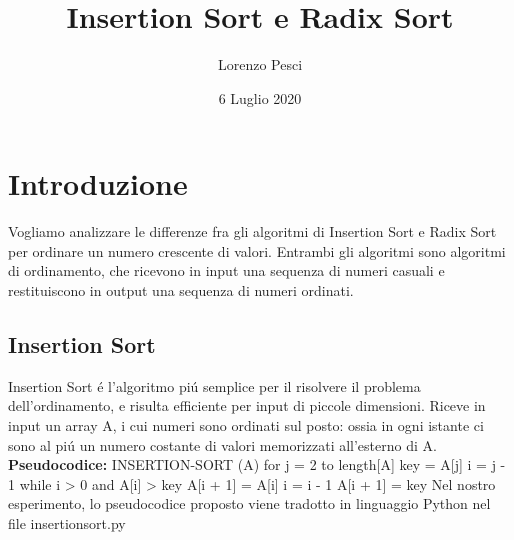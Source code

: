 \documentclass[a4paper]{article}
\title{\textbf{Insertion Sort e Radix Sort}}
\author{Lorenzo Pesci}
\date{6 Luglio 2020}
\begin{document}
\maketitle

\section{Introduzione}
Vogliamo analizzare le differenze fra gli algoritmi di Insertion Sort e Radix Sort per ordinare un numero crescente di valori.
\newline
Entrambi gli algoritmi sono algoritmi di ordinamento, che ricevono in input una sequenza di numeri casuali e restituiscono in output una sequenza di numeri ordinati.

\subsection{Insertion Sort}
Insertion Sort \'e l'algoritmo pi\'u semplice per il risolvere il problema dell'ordinamento, e risulta efficiente per input di piccole dimensioni.
\newline
Riceve in input un array A, i cui numeri sono ordinati sul posto: ossia in ogni istante ci sono al pi\'u un numero costante di valori memorizzati all'esterno di A.
\newline
\newline
\textbf{Pseudocodice:}
\newline
\newline
INSERTION-SORT (A)
 for j = 2 to length[A]
 \hspace{18pt} key = A[j]
 \hspace{18pt} i = j - 1
 \hspace{18pt} while i > 0 and A[i] > key
 \hspace{45pt} A[i + 1] = A[i]
 \hspace{47pt} i = i - 1
 \hspace{18pt} A[i + 1] = key
\newline
\newline
Nel nostro esperimento, lo pseudocodice proposto viene tradotto in linguaggio Python nel file insertionsort.py
\end{document}
